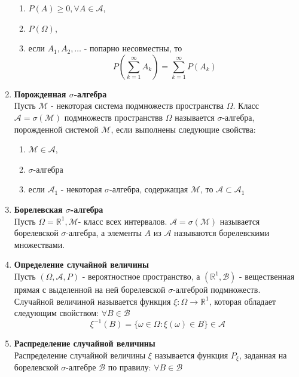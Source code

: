\documentclass[A4]{article}
\begin{document}
\begin{enumerate}
	\begin{enumerate}
		\item $P(A)\ge 0, \forall A\in \mathcal{A}$,
		\item $P(\Omega)$,
		\item если $A_1,A_2,\ldots$ - попарно несовместны, то 
		\begin{equation}
		P(\sum_{k=1}^{\infty}A_k)=\sum_{k=1}^{\infty} P(A_k)
		\end{equation} 
	\end{enumerate}
	\item \textbf{Порожденная $\sigma$-алгебра}\\
	Пусть $\mathcal{M}$ - некоторая система подмножеств пространства $\Omega$. Класс $\mathcal{A}=\sigma(\mathcal{M})$ подмножеств пространствв $\Omega$ называется $\sigma$-алгебра, порожденной системой $\mathcal{M}$, если выполнены следующие свойства:
	\begin{enumerate}
		\item $\mathcal{M}\in \mathcal{A}$,
		\item $\sigma$-алгебра
		\item если $\mathcal{A}_1 $ - некоторая $\sigma$-алгебра, содержащая $\mathcal{M}$, то $\mathcal{A}\subset\mathcal{A}_1 $
	\end{enumerate}
	\item \textbf{Борелевская $\sigma$-алгебра}\\
	Пусть $\Omega=\mathbb{R}^1, \mathcal{M}$- класс всех интервалов. $\mathcal{A}=\sigma(\mathcal{M})$ называется борелевской $\sigma$-алгебра, а элементы $A$ из $\mathcal{A}$ называются борелевскими множествами. 
	\item \textbf{Определение случайной величины}\\
	Пусть $(\Omega,\mathcal{A},P)$ - вероятностное пространство, а $(\mathbb{R}^1,\mathcal{B})$ - вещественная прямая с выделенной на ней борелевской $\sigma$-алгеброй подмножеств. Случайной величиной называется функция $\xi:\Omega\rightarrow \mathbb{R}^1$, которая обладает следующим свойством: $\forall B\in \mathcal{B}$
	\begin{equation}
	\xi^{-1}(B)=\{\omega\in\Omega:\xi(\omega)\in B\}\in \mathcal{A}
	\end{equation}
	\item \textbf{Распределение случайной величины}\\
	Распределение случайной величины $\xi$ называется функция $P_{\xi}$, заданная на борелевской $\sigma$-алгебре $\mathcal{B}$ по правилу: $\forall B\in \mathcal{B}$
	\begin{equation}

\end{equation}
\end{enumerate}
\end{document}
